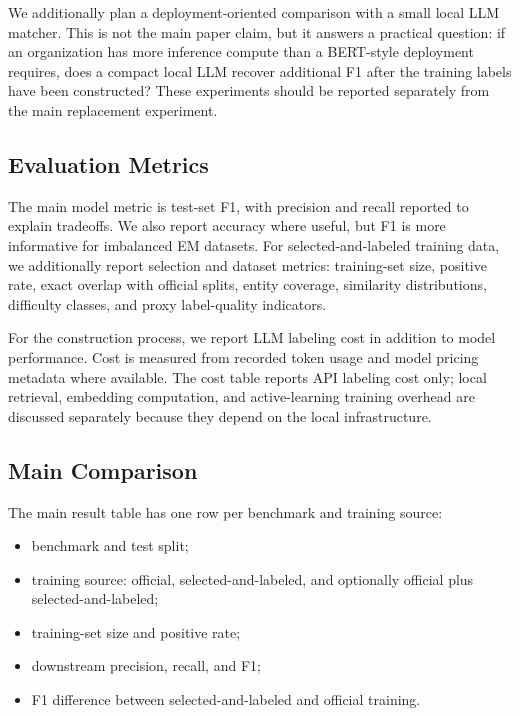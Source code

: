 We additionally plan a deployment-oriented comparison with a small local LLM matcher. This is not the main paper claim, but it answers a practical question: if an organization has more inference compute than a BERT-style deployment requires, does a compact local LLM recover additional F1 after the training labels have been constructed? These experiments should be reported separately from the main replacement experiment.

\subsection{Evaluation Metrics}

The main model metric is test-set F1, with precision and recall reported to explain tradeoffs. We also report accuracy where useful, but F1 is more informative for imbalanced EM datasets. For selected-and-labeled training data, we additionally report selection and dataset metrics: training-set size, positive rate, exact overlap with official splits, entity coverage, similarity distributions, difficulty classes, and proxy label-quality indicators.

For the construction process, we report LLM labeling cost in addition to model performance. Cost is measured from recorded token usage and model pricing metadata where available. The cost table reports API labeling cost only; local retrieval, embedding computation, and active-learning training overhead are discussed separately because they depend on the local infrastructure.

\subsection{Main Comparison}

The main result table has one row per benchmark and training source:

\begin{itemize}
  \item benchmark and test split;
  \item training source: official, selected-and-labeled, and optionally official plus selected-and-labeled;
  \item training-set size and positive rate;
  \item downstream precision, recall, and F1;
  \item F1 difference between selected-and-labeled and official training.
\end{itemize}

